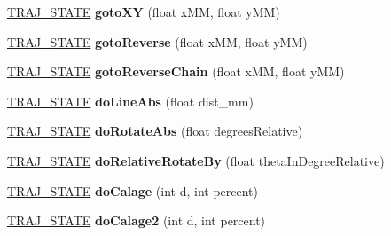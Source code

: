 \begin{DoxyCompactItemize}
\item 
\mbox{\label{classAsserv_a3208aa1d2cc84eff11770477b79aa6f7}} 
\hyperlink{path__manager_8h_adb3360abeb29758da93865c8afcb80eb}{T\+R\+A\+J\+\_\+\+S\+T\+A\+TE} {\bfseries goto\+XY} (float x\+MM, float y\+MM)
\item 
\mbox{\label{classAsserv_ade31f4182c755e3ee09092fe9bf3d5d0}} 
\hyperlink{path__manager_8h_adb3360abeb29758da93865c8afcb80eb}{T\+R\+A\+J\+\_\+\+S\+T\+A\+TE} {\bfseries goto\+Reverse} (float x\+MM, float y\+MM)
\item 
\mbox{\label{classAsserv_af02450d4e92f864b844a63ffe6fb16d3}} 
\hyperlink{path__manager_8h_adb3360abeb29758da93865c8afcb80eb}{T\+R\+A\+J\+\_\+\+S\+T\+A\+TE} {\bfseries goto\+Reverse\+Chain} (float x\+MM, float y\+MM)
\item 
\mbox{\label{classAsserv_a470496b8e6a0ef4cf0063c9b013aff35}} 
\hyperlink{path__manager_8h_adb3360abeb29758da93865c8afcb80eb}{T\+R\+A\+J\+\_\+\+S\+T\+A\+TE} {\bfseries do\+Line\+Abs} (float dist\+\_\+mm)
\item 
\mbox{\label{classAsserv_a2e7e67323efc1850803fea827614e8dc}} 
\hyperlink{path__manager_8h_adb3360abeb29758da93865c8afcb80eb}{T\+R\+A\+J\+\_\+\+S\+T\+A\+TE} {\bfseries do\+Rotate\+Abs} (float degrees\+Relative)
\item 
\mbox{\label{classAsserv_ab4983829a4592b28165f2fc3924572bd}} 
\hyperlink{path__manager_8h_adb3360abeb29758da93865c8afcb80eb}{T\+R\+A\+J\+\_\+\+S\+T\+A\+TE} {\bfseries do\+Relative\+Rotate\+By} (float theta\+In\+Degree\+Relative)
\item 
\mbox{\label{classAsserv_a0ac23995bdebb69bb49304850c951886}} 
\hyperlink{path__manager_8h_adb3360abeb29758da93865c8afcb80eb}{T\+R\+A\+J\+\_\+\+S\+T\+A\+TE} {\bfseries do\+Calage} (int d, int percent)
\item 
\mbox{\label{classAsserv_acc891ab26e32320b4f2fac646de93632}} 
\hyperlink{path__manager_8h_adb3360abeb29758da93865c8afcb80eb}{T\+R\+A\+J\+\_\+\+S\+T\+A\+TE} {\bfseries do\+Calage2} (int d, int percent)
\item 
\mbox{\label{classAsserv_a3468d8efb89878c2235dc491c6e7a541}} 

\end{DoxyCompactItemize}
